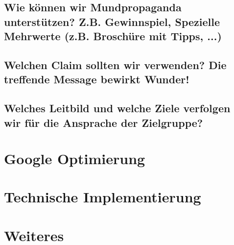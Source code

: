 \documentclass[11pt]{scrreprt}
\begin{document}
\section{Wie können wir Mundpropaganda
unterstützen?
Z.B. Gewinnspiel, Spezielle Mehrwerte (z.B.
Broschüre mit Tipps, ...)}

\section{Welchen Claim sollten wir verwenden?
Die treffende Message bewirkt Wunder!}

\section{Welches Leitbild und welche Ziele verfolgen wir
für die Ansprache der Zielgruppe?}

\chapter{Google Optimierung}
\chapter{Technische Implementierung}
\chapter{Weiteres}
\end{document}
